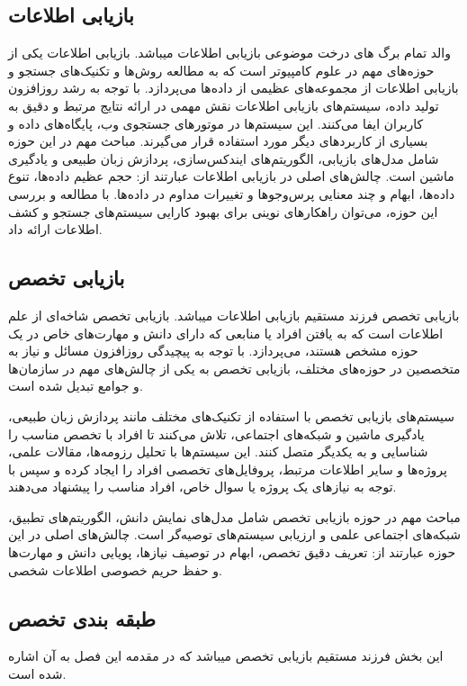 \subsection*{بازیابی اطلاعات}
والد تمام برگ های درخت موضوعی بازیابی اطلاعات میباشد.
بازیابی اطلاعات یکی از حوزه‌های مهم در علوم کامپیوتر است که به مطالعه روش‌ها و تکنیک‌های جستجو و بازیابی اطلاعات از مجموعه‌های عظیمی از داده‌ها می‌پردازد. با توجه به رشد روزافزون تولید داده، سیستم‌های بازیابی اطلاعات نقش مهمی در ارائه نتایج مرتبط و دقیق به کاربران ایفا می‌کنند. این سیستم‌ها در موتورهای جستجوی وب، پایگاه‌های داده و بسیاری از کاربردهای دیگر مورد استفاده قرار می‌گیرند. مباحث مهم در این حوزه شامل مدل‌های بازیابی، الگوریتم‌های ایندکس‌سازی، پردازش زبان طبیعی و یادگیری ماشین است. چالش‌های اصلی در بازیابی اطلاعات عبارتند از: حجم عظیم داده‌ها، تنوع داده‌ها، ابهام و چند معنایی پرس‌وجوها و تغییرات مداوم در داده‌ها. با مطالعه و بررسی این حوزه، می‌توان راهکارهای نوینی برای بهبود کارایی سیستم‌های جستجو و کشف اطلاعات ارائه داد.

\subsection*{بازیابی تخصص}
بازیابی تخصص فرزند مستقیم بازیابی اطلاعات میباشد. بازیابی تخصص شاخه‌ای از علم اطلاعات است که به یافتن افراد یا منابعی که دارای دانش و مهارت‌های خاص در یک حوزه مشخص هستند، می‌پردازد. با توجه به پیچیدگی روزافزون مسائل و نیاز به متخصصین در حوزه‌های مختلف، بازیابی تخصص به یکی از چالش‌های مهم در سازمان‌ها و جوامع تبدیل شده است.

سیستم‌های بازیابی تخصص با استفاده از تکنیک‌های مختلف مانند پردازش زبان طبیعی، یادگیری ماشین و شبکه‌های اجتماعی، تلاش می‌کنند تا افراد با تخصص مناسب را شناسایی و به یکدیگر متصل کنند. این سیستم‌ها با تحلیل رزومه‌ها، مقالات علمی، پروژه‌ها و سایر اطلاعات مرتبط، پروفایل‌های تخصصی افراد را ایجاد کرده و سپس با توجه به نیازهای یک پروژه یا سوال خاص، افراد مناسب را پیشنهاد می‌دهند.

مباحث مهم در حوزه بازیابی تخصص شامل مدل‌های نمایش دانش، الگوریتم‌های تطبیق، شبکه‌های اجتماعی علمی و ارزیابی سیستم‌های توصیه‌گر است. چالش‌های اصلی در این حوزه عبارتند از: تعریف دقیق تخصص، ابهام در توصیف نیازها، پویایی دانش و مهارت‌ها و حفظ حریم خصوصی اطلاعات شخصی.

\subsection*{طبقه بندی تخصص}
این بخش فرزند مستقیم بازیابی تخصص میباشد که در مقدمه این فصل به آن اشاره شده است.


